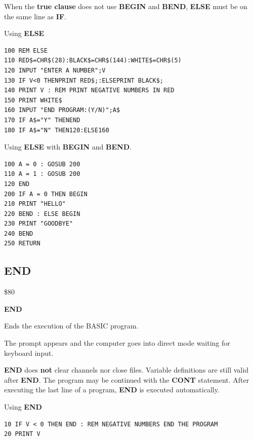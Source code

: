 \begin{description}[leftmargin=2cm,style=nextline]
               When the {\bf true clause} does not use {\bf BEGIN} and {\bf BEND},
               {\bf ELSE} must be on the same line as {\bf IF}.
\item [Example:]
                Using {\bf ELSE}
\begin{tcolorbox}[colback=black,coltext=white]
\verbatimfont{\codefont}
\begin{verbatim}
100 REM ELSE
110 RED$=CHR$(28):BLACK$=CHR$(144):WHITE$=CHR$(5)
120 INPUT "ENTER A NUMBER";V
130 IF V<0 THENPRINT RED$;:ELSEPRINT BLACK$;
140 PRINT V : REM PRINT NEGATIVE NUMBERS IN RED
150 PRINT WHITE$
160 INPUT "END PROGRAM:(Y/N)";A$
170 IF A$="Y" THENEND
180 IF A$="N" THEN120:ELSE160
\end{verbatim}
\end{tcolorbox}
                Using {\bf ELSE} with {\bf BEGIN} and {\bf BEND}.
\begin{tcolorbox}[colback=black,coltext=white]
\verbatimfont{\codefont}
\begin{verbatim}
100 A = 0 : GOSUB 200
110 A = 1 : GOSUB 200
120 END
200 IF A = 0 THEN BEGIN
210 PRINT "HELLO"
220 BEND : ELSE BEGIN
230 PRINT "GOODBYE"
240 BEND
250 RETURN
\end{verbatim}
\end{tcolorbox}
\end{description}



\newpage
\subsection{END}
\begin{description}[leftmargin=2cm,style=nextline]
\item [Token:] \$80
\item [Format:] {\bf END}
\item [Usage:] Ends the execution
               of the BASIC program.

               The  prompt
               appears and the computer goes into direct mode
               waiting for keyboard input.

\item [Remarks:]
               {\bf END} does {\bf not} clear channels nor close files.
               Variable definitions are still valid after {\bf END}.
               The program may be continued with the {\bf CONT}
               statement. After executing the last line of a
               program, {\bf END} is executed automatically.


\item [Example:]
                Using {\bf END}
\begin{tcolorbox}[colback=black,coltext=white]
\verbatimfont{\codefont}
\begin{verbatim}
10 IF V < 0 THEN END : REM NEGATIVE NUMBERS END THE PROGRAM
20 PRINT V
\end{verbatim}
\end{tcolorbox}
\end{description}

